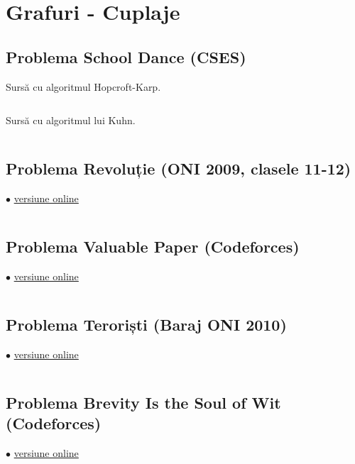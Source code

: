 \documentclass[../main.tex]{subfiles}
\begin{document}
\chapter{Grafuri - Cuplaje}

\section{Problema School Dance (CSES)}
\label{code:school-dance}

Sursă cu algoritmul Hopcroft-Karp.

\inputminted{cpp}{../src/graphs/school-dance-hopcroft-karp.cpp}

Sursă cu algoritmul lui Kuhn.

\inputminted{cpp}{../src/graphs/school-dance-kuhn.cpp}


\section{Problema Revoluție (ONI 2009, clasele 11-12)}
\label{code:revolutie}
$\bullet$
\href{https://kilonova.ro/submissions/1111069}{versiune online}

\inputminted{cpp}{../src/graphs/revolutie.cpp}


\section{Problema Valuable Paper (Codeforces)}
\label{code:valuable-paper}
$\bullet$
\href{https://codeforces.com/contest/1423/submission/254767564}{versiune online}

\inputminted{cpp}{../src/graphs/valuable-paper.cpp}


\section{Problema Teroriști (Baraj ONI 2010)}
\label{code:teroristi}
$\bullet$
\href{https://kilonova.ro/submissions/309923}{versiune online}

\inputminted{cpp}{../src/graphs/teroristi.cpp}


\section{Problema Brevity Is the Soul of Wit (Codeforces)}
\label{code:brevity-is-the-soul-of-wit}
$\bullet$
\href{https://codeforces.com/contest/120/submission/324014469}{versiune online}
\end{document}

